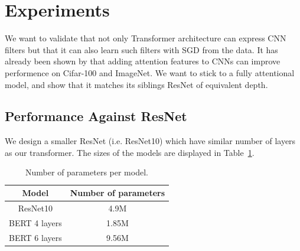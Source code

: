 \documentclass{article} %
\begin{document}
\section{Experiments}

We want to validate that not only Transformer architecture can express CNN filters
but that it can also learn such filters with SGD from the data.
%
It has already been shown by \citep{belloAttentionAugmentedConvolutional2019} that 
adding attention features to CNNs can improve performence on Cifar-100 and ImageNet.
%
We want to stick to a fully attentional model, and show that it matches its siblings ResNet of equivalent depth.

\subsection{Performance Against ResNet}

We design a smaller ResNet (i.e. ResNet10) which have similar number of layers as our transformer.
The sizes of the models are displayed in Table~\ref{tab:parameter_size}. 

\begin{table}
  \centering
  \begin{tabular}{cc}
    \toprule
    Model & Number of parameters\\
    \midrule
    ResNet10 & 4.9M\\
    BERT 4 layers & 1.85M\\
    BERT 6 layers & 9.56M \\
    \bottomrule
  \end{tabular}
  \caption{Number of parameters per model.}
  \label{tab:parameter_size}
\end{table}
\end{document}
